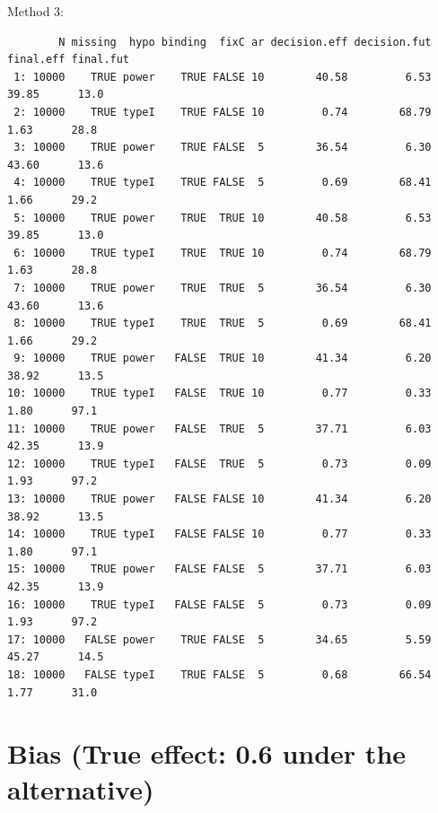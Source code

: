 \documentclass[12pt]{article}
\begin{document}
Method 3:
\begin{verbatim}
        N missing  hypo binding  fixC ar decision.eff decision.fut final.eff final.fut
 1: 10000    TRUE power    TRUE FALSE 10        40.58         6.53     39.85      13.0
 2: 10000    TRUE typeI    TRUE FALSE 10         0.74        68.79      1.63      28.8
 3: 10000    TRUE power    TRUE FALSE  5        36.54         6.30     43.60      13.6
 4: 10000    TRUE typeI    TRUE FALSE  5         0.69        68.41      1.66      29.2
 5: 10000    TRUE power    TRUE  TRUE 10        40.58         6.53     39.85      13.0
 6: 10000    TRUE typeI    TRUE  TRUE 10         0.74        68.79      1.63      28.8
 7: 10000    TRUE power    TRUE  TRUE  5        36.54         6.30     43.60      13.6
 8: 10000    TRUE typeI    TRUE  TRUE  5         0.69        68.41      1.66      29.2
 9: 10000    TRUE power   FALSE  TRUE 10        41.34         6.20     38.92      13.5
10: 10000    TRUE typeI   FALSE  TRUE 10         0.77         0.33      1.80      97.1
11: 10000    TRUE power   FALSE  TRUE  5        37.71         6.03     42.35      13.9
12: 10000    TRUE typeI   FALSE  TRUE  5         0.73         0.09      1.93      97.2
13: 10000    TRUE power   FALSE FALSE 10        41.34         6.20     38.92      13.5
14: 10000    TRUE typeI   FALSE FALSE 10         0.77         0.33      1.80      97.1
15: 10000    TRUE power   FALSE FALSE  5        37.71         6.03     42.35      13.9
16: 10000    TRUE typeI   FALSE FALSE  5         0.73         0.09      1.93      97.2
17: 10000   FALSE power    TRUE FALSE  5        34.65         5.59     45.27      14.5
18: 10000   FALSE typeI    TRUE FALSE  5         0.68        66.54      1.77      31.0
\end{verbatim}

\clearpage

\section{Bias (True effect: 0.6 under the alternative)}
\label{sec:orgfb93a4f}
\end{document}
